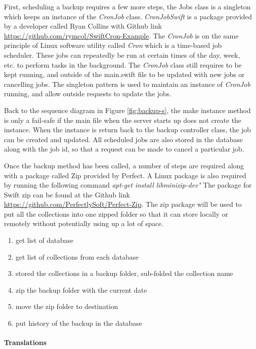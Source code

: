 First, scheduling a backup requires a few more steps, the Jobs class is a singleton which keeps an instance of the \textit{CronJob} class. \textit{CronJobSwift} is a package provided by a developer called Ryan Collins with Github link \url{https://github.com/rymcol/SwiftCron-Example}. The \textit{CronJob} is on the same principle of Linux software utility called \textit{Cron} which is a time-based job scheduler. These jobs can repeatedly be run at certain times of the day, week, etc. to perform tasks in the background. The \textit{CronJob} class still requires to be kept running, and outside of the main.swift file to be updated with new jobs or cancelling jobs. The singleton pattern is used to maintain an instance of \textit{CronJob} running, and allow outside requests to update the jobs.

Back to the sequence diagram in Figure \ref{fig:backup-s}, the make instance method is only a fail-safe if the main file when the server starts up does not create the instance. When the instance is return back to the backup controller class, the job can be created and updated. All scheduled jobs are also stored in the database along with the job id, so that a request can be made to cancel a particular job.

Once the backup method has been called, a number of steps are required along with a package called Zip provided by Perfect. A Linux package is also required by running the following command \textit{apt-get install libminizip-dev"} The package for Swift zip can be found at the Github link \url{https://github.com/PerfectlySoft/Perfect-Zip}. The zip package will be used to put all the collections into one zipped folder so that it can store locally or remotely without potentially using up a lot of space.

\begin{enumerate}
  \item get list of database 
  \item get list of collections from each database
  \item stored the collections in a backup folder, sub-folded the collection name
  \item zip the backup folder with the current date
  \item move the zip folder to destination
  \item put history of the backup in the database
\end{enumerate}

\paragraph{Translations}

